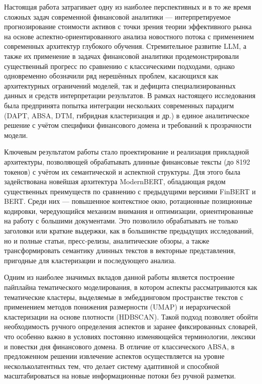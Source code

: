Настоящая работа затрагивает одну из наиболее перспективных и в то же время сложных задач современной
финансовой аналитики --- интерпретируемое  прогнозирование стоимости активов с точки зрения теории
эффективного рынка на основе аспектно-ориентированного анализа новостного потока с применением
современных архитектур глубокого обучения. Стремительное развитие LLM, а также их применение в задачах
финансовой аналитики продемонстрировали существенный прогресс по сравнению с классическими подходами,
однако одновременно обозначили ряд нерешённых проблем, касающихся как архитектурных ограничений
моделей, так и дефицита специализированных данных и средств интерпретации результатов. В рамках
настоящего исследования была предпринята попытка интеграции нескольких современных парадигм (DAPT,
ABSA, DTM, гибридная кластеризация и др.) в единое аналитическое решение с учётом специфики финансового
домена и требований к прозрачности модели.

Ключевым результатом работы стало проектирование и реализация прикладной архитектуры, позволяющей
обрабатывать длинные финансовые тексты (до 8192 токенов) с учётом их семантической и аспектной структуры.
Для этого была задействована новейшая архитектура ModernBERT, обладающая рядом существенных преимуществ
по сравнению с предыдущими версиями FinBERT и BERT. Среди них — повышенное контекстное окно, ротационные
позиционные кодировки, чередующийся механизм внимания и оптимизации, ориентированные на работу с большими
документами. Это позволило обрабатывать не только заголовки или краткие выдержки, как в большинстве
предыдущих исследований, но и полные статьи, пресс-релизы, аналитические обзоры, а также трансформировать
семантику длинных текстов в векторные представления, пригодные для кластеризации и последующего анализа.

Одним из наиболее значимых вкладов данной работы является построение пайплайна тематического моделирования,
в котором аспекты рассматриваются как тематические кластеры, выделяемые в эмбеддинговом пространстве текстов
с применением методов понижения размерности (UMAP) и иерархической кластеризации на основе плотности
(HDBSCAN). Такой подход позволяет обойти необходимость ручного определения аспектов и заранее фиксированных
словарей, что особенно важно в условиях постоянно изменяющейся терминологии, лексики и повестки дня финансового
домена. В отличие от классического ABSA, в предложенном решении извлечение аспектов осуществляется на уровне
нескольколатентных тем, что делает систему адаптивной и способной масштабироваться на новые информационные потоки
без ручной разметки.

